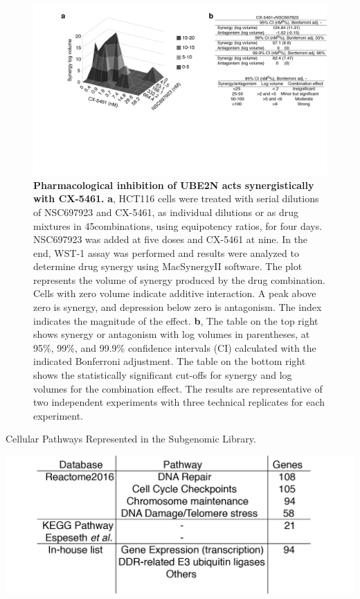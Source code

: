 \clearpage

\begin{figure}
    \centering
    \includegraphics[width=1\textwidth]{../figures/Figure5_drug_synergy}
    \caption[Chromatin ubiquitination]
            {\small{\textbf{Pharmacological inhibition of UBE2N acts synergistically with CX-5461.}}
            \newline
            \textbf{a}, HCT116 cells were treated with serial dilutions of NSC697923 and CX-5461, as individual dilutions or as drug mixtures in 45combinations, using equipotency ratios, for four days. NSC697923 was added at five doses and CX-5461 at nine. In the end, WST-1 assay was performed and results were analyzed to determine drug synergy using MacSynergyII software. The plot represents the volume of synergy produced by the drug combination. Cells with zero volume indicate additive interaction. A peak above zero is synergy, and depression below zero is antagonism. The index indicates the magnitude of the effect.
            \newline
            \textbf{b}, The table on the top right shows synergy or antagonism with log volumes in parentheses, at 95\%, 99\%, and 99.9\% confidence intervals (CI) calculated with the indicated Bonferroni adjustment. The table on the bottom right shows the statistically significant cut-offs for synergy and log volumes for the combination effect. The results are representative of two independent experiments with three technical replicates for each experiment.
            }
        \label{fig:drug-synergy}
\end{figure}

\clearpage

\begin{table}
\caption{Cellular Pathways Represented in the Subgenomic Library.}
\centering
\includegraphics[width=1\textwidth]{../tables/Table1_library_design}
\label{table:library-design}
\end{table}

